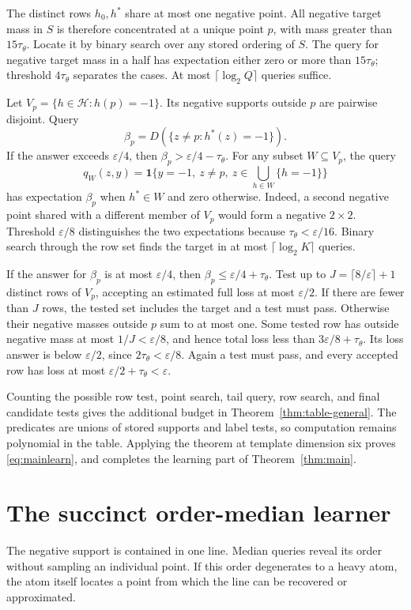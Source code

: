 \documentclass[11pt,letterpaper,pmlr,twoside]{jmlr}
\newcommand{\Hc}{\mathcal H}
\newcommand{\one}{\mathbf 1}
\newcommand{\eps}{\varepsilon}
\newcommand{\ceil}[1]{\lceil #1\rceil}
\begin{document}
The distinct rows $h_0,h^*$ share at most one negative point. All negative target mass in $S$ is therefore concentrated at a unique point $p$, with mass greater than $15\tau_\theta$. Locate it by binary search over any stored ordering of $S$. The query for negative target mass in a half has expectation either zero or more than $15\tau_\theta$; threshold $4\tau_\theta$ separates the cases. At most $\ceil{\log_2Q}$ queries suffice.

Let $V_p=\{h\in\Hc:h(p)=-1\}$. Its negative supports outside $p$ are pairwise disjoint. Query
\[
 \beta_p=D(\{z\ne p:h^*(z)=-1\}).
\]
If the answer exceeds $\eps/4$, then $\beta_p>\eps/4-\tau_\theta$. For any subset $W\subseteq V_p$, the query
\[
 q_W(z,y)=\one\{y=-1,\ z\ne p,\ z\in\!\bigcup_{h\in W}\{h=-1\}\}
\]
has expectation $\beta_p$ when $h^*\in W$ and zero otherwise. Indeed, a second negative point shared with a different member of $V_p$ would form a negative $2\times2$. Threshold $\eps/8$ distinguishes the two expectations because $\tau_\theta<\eps/16$. Binary search through the row set finds the target in at most $\ceil{\log_2K}$ queries.

If the answer for $\beta_p$ is at most $\eps/4$, then $\beta_p\le\eps/4+\tau_\theta$. Test up to $J=\ceil{8/\eps}+1$ distinct rows of $V_p$, accepting an estimated full loss at most $\eps/2$. If there are fewer than $J$ rows, the tested set includes the target and a test must pass. Otherwise their negative masses outside $p$ sum to at most one. Some tested row has outside negative mass at most $1/J<\eps/8$, and hence total loss less than $3\eps/8+\tau_\theta$. Its loss answer is below $\eps/2$, since $2\tau_\theta<\eps/8$. Again a test must pass, and every accepted row has loss at most $\eps/2+\tau_\theta<\eps$.

Counting the possible row test, point search, tail query, row search, and final candidate tests gives the additional budget in Theorem~\ref{thm:table-general}. The predicates are unions of stored supports and label tests, so computation remains polynomial in the table. Applying the theorem at template dimension six proves \eqref{eq:mainlearn}, and completes the learning part of Theorem~\ref{thm:main}.

\section{The succinct order-median learner}
\label{app:median}
The negative support is contained in one line. Median queries reveal its order without sampling an individual point. If this order degenerates to a heavy atom, the atom itself locates a point from which the line can be recovered or approximated.
\end{document}
